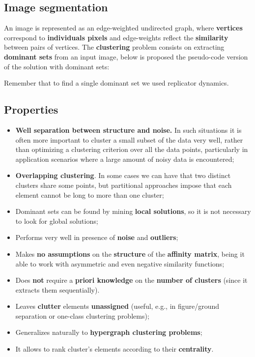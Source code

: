 \subsection{Image segmentation}
An image is represented as an edge-weighted undirected graph, where \textbf{vertices} correspond to \textbf{individuals pixels} and edge-weights reflect the \textbf{similarity} between pairs of vertices. The \textbf{clustering} problem consists on extracting \textbf{dominant sets} from an input image, below is proposed the pseudo-code version of the solution with dominant sets:

Remember that to find a single dominant set we used replicator dynamics.


\subsection{Properties}
\begin{itemize}
	\item \textbf{Well separation between structure and noise.} In such situations it is often more important to cluster a small subset of the data very well, rather than optimizing a clustering criterion over all the data points, particularly in application scenarios where a large amount of noisy data is encountered;
	
	\item \textbf{Overlapping clustering}. In some cases we can have that two distinct clusters share some points, but partitional approaches impose that each element cannot be long to more than one cluster;
	
	\item Dominant sets can be found by mining \textbf{local solutions}, so it is not necessary to look for global solutions;
	
	\item Performs very well in presence of \textbf{noise} and \textbf{outliers};
		
	\item Makes \textbf{no assumptions} on the \textbf{structure} of the \textbf{affinity matrix}, being it able to work with asymmetric and even negative similarity functions;
	
	\item Does \textbf{not} require a \textbf{priori knowledge} on the \textbf{number of clusters} (since it extracts them sequentially).
	
	\item Leaves \textbf{clutter} elements \textbf{unassigned} (useful, e.g., in figure/ground separation or one-class clustering problems);
	
	\item Generalizes naturally to \textbf{hypergraph clustering problems};

        \item It allows to rank cluster's elements according to their \textbf{centrality}.
\end{itemize}
